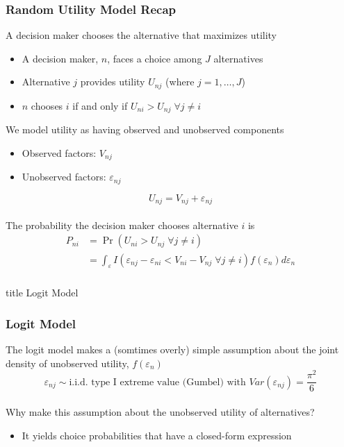 \documentclass{beamer}
\begin{document}
\begin{frame}\frametitle{Random Utility Model Recap}
    A decision maker chooses the alternative that maximizes utility
    \begin{itemize}
		\item A decision maker, $n$, faces a choice among $J$ alternatives
    	\item Alternative $j$ provides utility $U_{nj}$ (where $j = 1, \ldots, J$)
    	\item $n$ chooses $i$ if and only if $U_{ni} > U_{nj} \; \forall j \neq i$
   	\end{itemize}
   	\vspace{2ex}
   	We model utility as having observed and unobserved components
   	\begin{itemize}
		\item Observed factors: $V_{nj}$
		\item Unobserved factors: $\varepsilon_{nj}$
	\end{itemize}
	$$U_{nj} = V_{nj} + \varepsilon_{nj}$$ \\
	\vspace{2ex}
	The probability the decision maker chooses alternative $i$ is
    \begin{align*}
    	P_{ni} &= \Pr(U_{ni} > U_{nj} \; \forall j \neq i) \\
    	&= \int_\varepsilon I(\varepsilon_{nj} - \varepsilon_{ni} < V_{ni} - V_{nj} \; \forall j \neq i) f(\varepsilon_n) d\varepsilon_n
    \end{align*}
\end{frame}

\begin{frame}\frametitle{}
    \vfill
    \centering
    \begin{beamercolorbox}[center]{title}
        \Large Logit Model
    \end{beamercolorbox}
    \vfill
\end{frame}

\begin{frame}\frametitle{Logit Model}
    The logit model makes a (somtimes overly) simple assumption about the joint density of unobserved utility, $f(\varepsilon_n)$
    $$\varepsilon_{nj} \sim \text{i.i.d.\ type I extreme value (Gumbel) with } Var(\varepsilon_{nj}) = \frac{\pi^2}{6}$$ \\
    \vspace{3ex}
    Why make this assumption about the unobserved utility of alternatives?
    \begin{itemize}
    	\item It yields choice probabilities that have a closed-form expression
    \end{itemize}
\end{frame}
\end{document}

